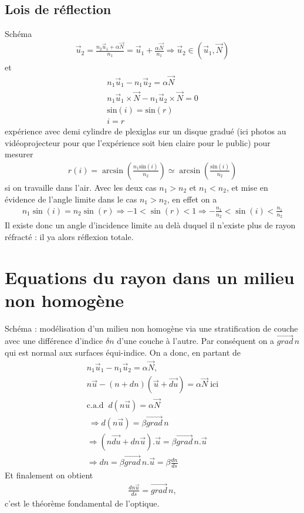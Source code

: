 \documentclass[12pt,prb,aps,epsf]{report}
\begin{document}
\subsection{Lois de réflection}
Schéma\\
\begin{eqnarray}
\vec{u}_2 = \frac{n_2\vec{u}_1+\alpha\vec{N}}{n_1} = \vec{u}_1 + \frac{\alpha \vec{N}}{n_1} \Rightarrow \vec{u}_2 \in (\vec{u}_1,\vec{N})
\end{eqnarray}
et 
\begin{eqnarray}
n_1\vec{u}_1-n_1\vec{u}_2= \alpha  \vec{N}\\
n_1\vec{u}_1\times\vec{N}-n_1\vec{u}_2\times\vec{N}= 0\\
 \mathrm{sin}(i) = \mathrm{sin}(r)\\
 i=r
\end{eqnarray}
expérience avec demi cylindre de plexiglas sur un disque gradué (ici photos au vidéoprojecteur pour que l'expérience soit bien claire pour le public) pour mesurer 
\begin{eqnarray}
r(i) =\arcsin\left(\frac{n_1\mathrm{sin}(i)}{n_2}\right)\simeq\arcsin\left(\frac{\mathrm{sin}(i)}{n_2}\right) 
\end{eqnarray}  si on travaille dans l'air. Avec les deux cas $n_1>n_2$ et $n_1<n_2$, et mise en évidence de l'angle limite dans le cas $n_1>n_2$, en effet on a 
\begin{eqnarray}
n_1\sin(i) = n_2\sin(r) \Rightarrow -1 < \sin(r) < 1 \Rightarrow -\frac{n_1}{n_2} < \sin(i) < \frac{n_1}{n_2}
\end{eqnarray}
Il existe donc un angle d'incidence limite au delà duquel il n'existe plus de rayon réfracté : il ya alors réflexion totale.

\section{Equations du rayon dans un milieu non homogène}
Schéma : modélisation d'un milieu non homogène via une stratification de couche avec une différence d'indice $\delta n$ d'une couche à l'autre. Par conséquent on a $\vec{grad}\,n$ qui est normal aux surfaces équi-indice. On a donc, en partant de 
\begin{eqnarray}
n_1\vec{u}_1-n_1\vec{u}_2= \alpha  \vec{N},\\
n\vec{u}-(n+dn)(\vec{u}+\vec{du})= \alpha  \vec{N}\; \mathrm{ici}\\
\mathrm{c.a.d}\;\;d(n\vec{u}) = \alpha\vec{N} \\\
\Rightarrow d(n\vec{u}) = \beta \vec{grad}\,n\\
\Rightarrow (n\vec{du} + dn\vec{u}).\vec{u} = \beta \vec{grad}\,n.\vec{u}\\
\Rightarrow dn = \beta \vec{grad}\,n.\vec{u} =  \beta \frac{dn}{ds}
\end{eqnarray}
Et finalement on obtient 
\begin{eqnarray}
\frac{dn\vec{u}}{ds} = \vec{grad}\,n,
\end{eqnarray}
c'est le théorème fondamental de l'optique.
\end{document}
